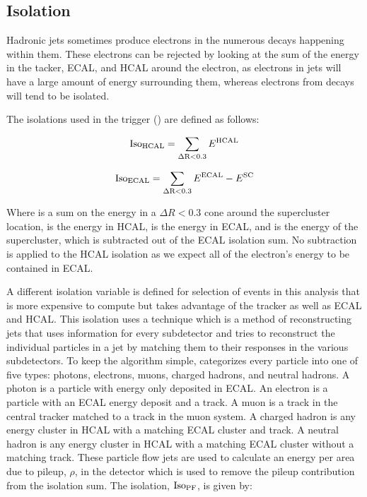 \subsection{Isolation}

Hadronic jets sometimes produce electrons in the numerous decays happening
within them. These electrons can be rejected by looking at the sum of the
energy in the tacker, ECAL, and HCAL around the electron, as electrons in jets
will have a large amount of energy surrounding them, whereas electrons from \Z
decays will tend to be isolated.

The isolations used in the trigger (\SingleElectronTrigger) are defined as
follows:

\begin{equation}
    \text{Iso}_{\text{HCAL}} = \sum_{\Delta \text{R}<0.3} E^{\text{HCAL}}
\end{equation}

\begin{equation}
    \text{Iso}_{\text{ECAL}} = \sum_{\Delta \text{R}<0.3} E^{\text{ECAL}} - E^{\text{SC}}
\end{equation}

Where \DeltaRSum is a sum on the energy in a $\Delta R < 0.3$ cone around the
supercluster location, \EHCAL is the energy in HCAL, \EECAL is the energy in
ECAL, and \ESC is the energy of the supercluster, which is subtracted out of
the ECAL isolation sum. No subtraction is applied to the HCAL isolation as we
expect all of the electron's energy to be contained in ECAL.

A different isolation variable is defined for selection of events in this
analysis that is more expensive to compute but takes advantage of the tracker
as well as ECAL and HCAL. This isolation uses a
\particleflow\cite{particle_flow_2010} technique which is a method of
reconstructing jets that uses information for every subdetector and tries to
reconstruct the individual particles in a jet by matching them to their
responses in the various subdetectors. To keep the algorithm simple,
\particleflow categorizes every particle into one of five types: photons,
electrons, muons, charged hadrons, and neutral hadrons. A photon is a particle
with energy only deposited in ECAL. An electron is a particle with an ECAL
energy deposit and a track. A muon is a track in the central tracker matched to
a track in the muon system. A charged hadron is any energy cluster in HCAL with
a matching ECAL cluster and track. A neutral hadron is any energy cluster in
HCAL with a matching ECAL cluster without a matching track. These particle flow
jets are used to calculate an energy per area due to pileup, $\rho$, in the
detector which is used to remove the pileup contribution from the isolation
sum. The \particleflow isolation, $\text{Iso}_{\text{PF}}$, is given by:

